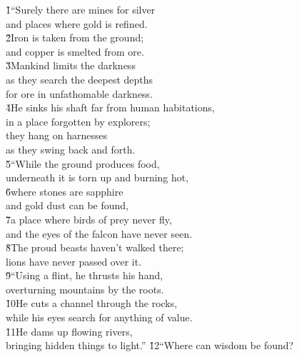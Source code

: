 \begin{poetry}
\poeml {}
\v{1}``Surely there are mines for silver \\
\poemll    and places where gold is refined. \\
\poeml \v{2}Iron is taken from the ground; \\
\poemll    and copper is smelted from ore. \\
\poeml \v{3}Mankind limits the darkness \\
\poemll    as they search the deepest depths \\
\poemlll       for ore in unfathomable darkness. \\
\poeml \v{4}He sinks his shaft far from human habitations, \\
\poemll    in a place forgotten by explorers; \\
\poeml they hang on harnesses \\
\poemll    as they swing back and forth. \\
\poeml \v{5}``While the ground produces food, \\
\poemll    underneath it is torn up and burning hot, \\
\poeml \v{6}where stones are sapphire \\
\poemll    and gold dust can be found, \\
\poeml \v{7}a place where birds of prey never fly, \\
\poemll    and the eyes of the falcon have never seen. \\
\poeml \v{8}The proud beasts haven't walked there; \\
\poemll    lions have never passed over it. \\
\poeml \v{9}``Using a flint, he thrusts his hand, \\
\poemll    overturning mountains by the roots. \\
\poeml \v{10}He cuts a channel through the rocks, \\
\poemll    while his eyes search for anything of value. \\
\poeml \v{11}He dams up flowing rivers, \\
\poemll    bringing hidden things to light.''
\poeml \v{12}``Where can wisdom be found? \\

\end{poetry}
